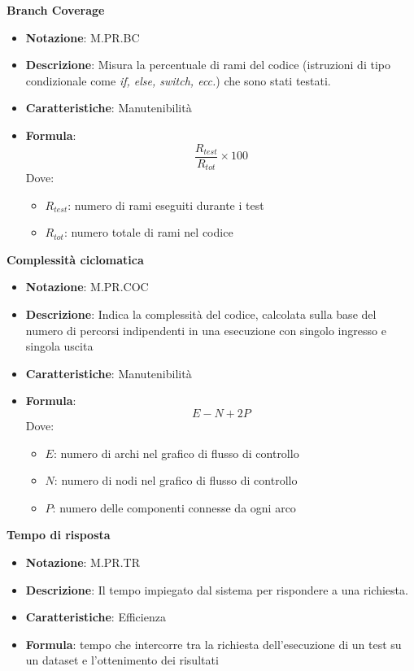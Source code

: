 \textbf{Branch Coverage}
\begin{itemize}
    \item \textbf{Notazione}: M.PR.BC
    \item \textbf{Descrizione}: Misura la percentuale di rami del codice (istruzioni di tipo condizionale come \textit{if, else, switch, ecc.}) che sono stati testati.
    \item \textbf{Caratteristiche}: Manutenibilità
    \item \textbf{Formula}: 
    \begin{equation}
        \frac{R_{test}}{R_{tot}} \times 100
    \end{equation}
    Dove:
    \begin{itemize}
        \item $R_{test}$: numero di rami eseguiti durante i test
        \item $R_{tot}$: numero totale di rami nel codice 
    \end{itemize}
\end{itemize}

\textbf{Complessità ciclomatica}
\begin{itemize}
    \item \textbf{Notazione}: M.PR.COC
    \item \textbf{Descrizione}: Indica la complessità del codice, calcolata sulla base del numero di percorsi indipendenti in una esecuzione con singolo ingresso e singola uscita
    \item \textbf{Caratteristiche}: Manutenibilità
    \item \textbf{Formula}: 
    \begin{equation}
        E - N + 2P
    \end{equation}
    Dove:
    \begin{itemize}
        \item $E$: numero di archi nel grafico di flusso di controllo
        \item $N$: numero di nodi nel grafico di flusso di controllo
        \item $P$: numero delle componenti connesse da ogni arco
    \end{itemize}
\end{itemize}

\textbf{Tempo di risposta}
\begin{itemize}  
    \item \textbf{Notazione}: M.PR.TR
    \item \textbf{Descrizione}:  Il tempo impiegato dal sistema per rispondere a una richiesta.
    \item \textbf{Caratteristiche}: Efficienza
    \item \textbf{Formula}: tempo che intercorre tra la richiesta dell'esecuzione di un test su un dataset e l'ottenimento dei risultati
\end{itemize}

